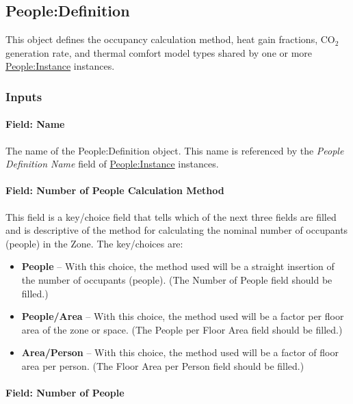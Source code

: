 \subsection{People:Definition}\label{peopledefinition}

This object defines the occupancy calculation method, heat gain fractions, CO\(_{2}\) generation rate, and thermal comfort model types shared by one or more \hyperref[peopleinstance]{People:Instance} instances.

\subsubsection{Inputs}\label{inputs-peopledefinition}

\paragraph{Field: Name}\label{field-name-peopledefinition}

The name of the People:Definition object. This name is referenced by the \textit{People Definition Name} field of \hyperref[peopleinstance]{People:Instance} instances.

\paragraph{Field: Number of People Calculation Method}\label{field-number-of-people-calculation-method-people-definition}

This field is a key/choice field that tells which of the next three fields are filled and is descriptive of the method for calculating the nominal number of occupants (people) in the Zone. The key/choices are:

\begin{itemize}
\tightlist
\item
  \textbf{People} -- With this choice, the method used will be a straight insertion of the number of occupants (people). (The Number of People field should be filled.)
\item
  \textbf{People/Area} -- With this choice, the method used will be a factor per floor area of the zone or space. (The People per Floor Area field should be filled.)
\item
  \textbf{Area/Person} -- With this choice, the method used will be a factor of floor area per person. (The Floor Area per Person field should be filled.)
\end{itemize}

\paragraph{Field: Number of People}\label{field-number-of-people-people-definition}


